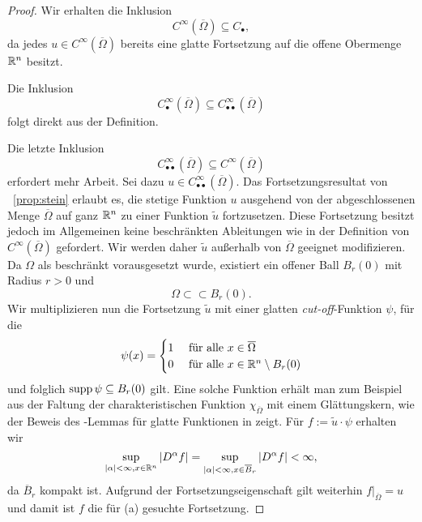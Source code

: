 \begin{proof}
  Wir erhalten die Inklusion
  $$
  C^\infty(\overline\Omega) \subseteq C_{\bullet},
  $$ 
  da jedes $u\in C^\infty(\overline\Omega)$ bereits eine glatte Fortsetzung auf die offene Obermenge $\mathbb{R}^n$ besitzt.

  Die Inklusion $$C^\infty_{\bullet}(\overline\Omega) \subseteq C^\infty_{\bullet\bullet}(\overline\Omega)$$ folgt direkt aus der Definition.
  
  Die letzte Inklusion $$C^\infty_{\bullet\bullet}(\overline\Omega) \subseteq C^\infty(\overline\Omega)$$ erfordert mehr Arbeit.
  Sei dazu $u \in C^\infty_{\bullet\bullet}(\overline\Omega)$.
  Das Fortsetzungsresultat von \stein\ \ref{prop:stein} erlaubt es, die stetige Funktion $u$ ausgehend von der abgeschlossenen Menge $\overline\Omega$ auf ganz $\mathbb{R}^n$ zu einer Funktion $\tilde u$ fortzusetzen.
  Diese Fortsetzung besitzt jedoch im Allgemeinen keine beschränkten Ableitungen wie in der Definition von $C^\infty(\overline\Omega)$ gefordert.
  Wir werden daher $\tilde u$ außerhalb von $\overline\Omega$ geeignet modifizieren.
  Da $\Omega$ als beschränkt vorausgesetzt wurde, existiert ein offener Ball $B_r(0)$ mit Radius $r > 0$ und 
  $$
   \Omega \subset\subset B_r(0).
  $$ 
  Wir multiplizieren nun die Fortsetzung $\tilde u$ mit einer glatten \emph{cut-off}\hyp{}Funktion $\psi$, für die
  $$ 
  \psi(x) = \begin{cases}
                          1 &\text{ für alle } x \in \overline\Omega \\
                          0 &\text{ für alle } x \in \mathbb{R}^n \setminus B_r(0)
             \end{cases}
  $$
  und folglich $\operatorname{supp} \psi \subseteq B_r(0)$ gilt.
  Eine solche Funktion erhält man zum Beispiel aus der Faltung der charakteristischen Funktion $\chi_{\overline\Omega}$ mit einem Glättungskern, wie der Beweis des \urysohn\hyp{}Lemmas für glatte Funktionen in \cite[S.88, Proposition 6.5]{folland2009ra} zeigt. 
  Für $f := \tilde u \cdot \psi$ erhalten wir
  $$
  \sup_{|\alpha| < \infty, x \in \mathbb{R}^n} | D^\alpha f |
   = \sup_{|\alpha| < \infty, x \in \overline B_r} | D^\alpha f |
   < \infty,
  $$
  da $\overline B_r$ kompakt ist.
  Aufgrund der Fortsetzungseigenschaft gilt weiterhin $f|_{\overline\Omega} = u$ und damit ist $f$ die für (a) gesuchte Fortsetzung.
\end{proof}

